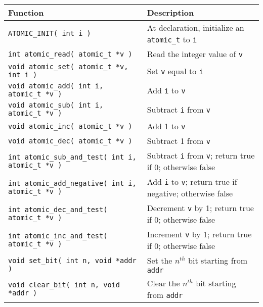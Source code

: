 \begin{center}
\begin{tabular}{l|l}
	\textbf{Function} & \textbf{Description}\\\hline

	\texttt{ATOMIC\_INIT( int i )} & At declaration, initialize an \texttt{atomic\_t} to \texttt{i}\\\hline

\texttt{int atomic\_read( atomic\_t *v )} &  Read the integer value of \texttt{v}\\\hline

\texttt{void atomic\_set( atomic\_t *v, int i )} & Set \texttt{v} equal to \texttt{i}\\\hline

\texttt{void atomic\_add( int i, atomic\_t *v )} & Add \texttt{i} to \texttt{v}\\\hline

\texttt{void atomic\_sub( int i, atomic\_t *v )} & Subtract \texttt{i} from \texttt{v}\\\hline

\texttt{void atomic\_inc( atomic\_t *v )} & Add 1 to \texttt{v}\\\hline

\texttt{void atomic\_dec( atomic\_t *v )} & Subtract 1 from \texttt{v}\\\hline

\texttt{int atomic\_sub\_and\_test( int i, atomic\_t *v )} & Subtract \texttt{i} from \texttt{v}; return true if 0; otherwise false\\\hline

\texttt{int atomic\_add\_negative( int i, atomic\_t *v )} & Add \texttt{i} to \texttt{v}; return true if negative; otherwise false\\\hline

\texttt{int atomic\_dec\_and\_test( atomic\_t *v )} & Decrement \texttt{v} by 1; return true if 0; otherwise false\\\hline

\texttt{int atomic\_inc\_and\_test( atomic\_t *v )} & Increment \texttt{v} by 1; return true if 0; otherwise false\\ \hline\hline

\texttt{void set\_bit( int n, void *addr )} &  Set the $n^{th}$ bit starting from \texttt{addr}\\\hline

\texttt{void clear\_bit( int n, void *addr )} &  Clear the $n^{th}$ bit starting from \texttt{addr}\\\hline


\end{tabular}
\end{center}
